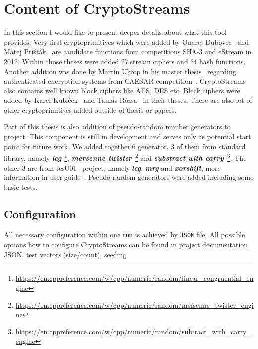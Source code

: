 \documentclass[
    digital,    %
    oneside,    %
    color,
    11pt,
    nocover,
    notable,
    nolof,
    nolot,
    final
]{fithesis3}
\begin{document}
\section{Content of CryptoStreams}

In this section I would like to present deeper details about what this tool provides. Very first cryptoprimitives which were added by Ondrej Dubovec~\cite{Dubovec2012thesis} and Matej Prišťák~\cite{Pristak2012thesis} are candidate functions from competitions SHA-3 and eStream  in 2012. Within those theses were added 27 stream ciphers and 34 hash functions. Another addition was done by Martin Ukrop in his master thesis~\cite{Ukrop2016thesis} regarding authenticated encryption systems from CAESAR competition~\cite{caesar-competition}. CryptoStreams also contains well known block ciphers like AES, DES etc. Block ciphers were added by Karel Kubíček~\cite{Kubicek2017thesis} and Tamás Rózsa~\cite{Rozsa2018thesis} in their theses. There are also lot of other cryptoprimitives added outside of thesis or papers.


Part of this thesis is also addition of pseudo-random number generators to project. This component is still in development and serves only as potential start point for future work. We added together 6 generator. 3 of them from standard library, namely \textit{\textbf{lcg}}~\footnote{\url{ https://en.cppreference.com/w/cpp/numeric/random/linear\_congruential\_engine}}, \textbf{\textit{mersenne twister}}~\footnote{\url{https://en.cppreference.com/w/cpp/numeric/random/mersenne\_twister\_engine}} and \textbf{\textit{substract with carry}}~\footnote{\url{https://en.cppreference.com/w/cpp/numeric/random/subtract\_with\_carry_engine}}. The other 3 are from tesU01~\cite{l2007testu01} project, namely \textbf{\textit{lcg}}, \textbf{\textit{mrg}} and \textbf{\textit{xorshift}}, more information in user guide~\cite{LEcuyer07testu01}. Pseudo random generators were added including some basic tests.

\subsection{Configuration}

All necessary configuration within one run is achieved by \texttt{JSON} file. All possible options how to configure CryptoStreams can be found in project documentation~\cite{CryptoStreams-wiki}
JSON, test vectors (size/count), seeding
\end{document}
